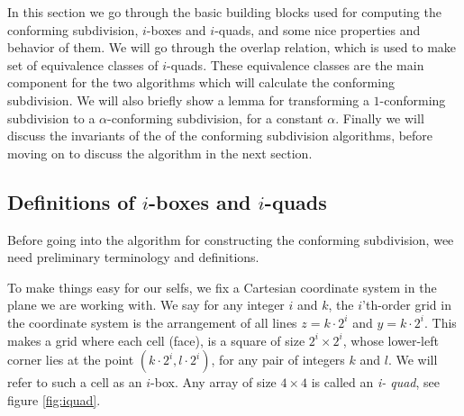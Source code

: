 In this section we go through the basic building blocks used for computing the conforming 
subdivision, $i$-boxes and $i$-quads, and some nice properties and behavior of them. We will go 
through the overlap relation, which is used to make set of equivalence classes of $i$-quads. These 
equivalence classes are the main component for the two algorithms which will calculate the conforming 
subdivision. We will also briefly show a lemma for transforming a $1$-conforming subdivision to a 
$\alpha$-conforming subdivision, for a constant $\alpha$. Finally we will discuss the invariants of 
the of the conforming subdivision algorithms, before moving on to discuss the algorithm in the next 
section. 

\subsection{Definitions of $i$-boxes and $i$-quads}

Before going into the algorithm for constructing the conforming subdivision, wee need
preliminary terminology and definitions.

To make things easy for our selfs, we fix a Cartesian coordinate system in the plane we are 
working with. We say for any integer $i$ and $k$, the $i$'th-order grid in the coordinate 
system is the arrangement of all lines $z = k \cdot 2^i$ and $y = k \cdot 2^i$. This makes a 
grid where each cell (face), is a square of size $2^i \times 2 ^i$, whose lower-left corner 
lies at the point $(k \cdot 2^i, l \cdot 2^i)$, for any pair of integers $k$ and $l$. We will 
refer to such a cell as an $i$-box. Any array of size $4 \times 4$ is called an \textit{i-
quad}, see figure \ref{fig:iquad}.

